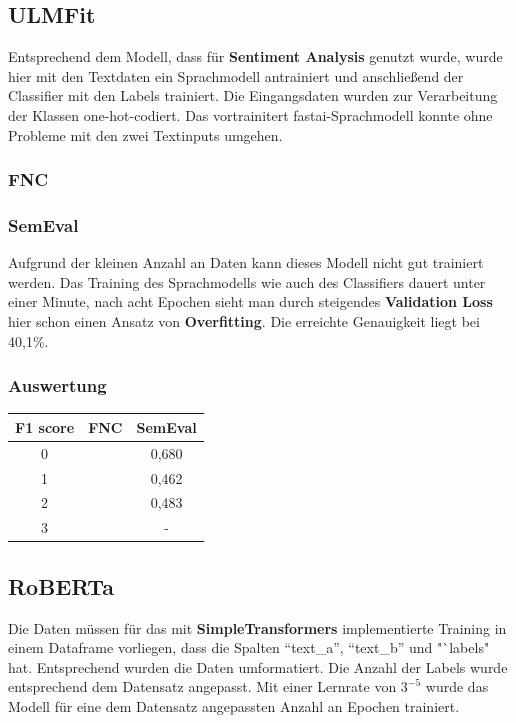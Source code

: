 \subsection{ULMFit}
Entsprechend dem Modell, dass f\"ur \textbf{Sentiment Analysis} genutzt wurde, wurde hier mit den Textdaten ein Sprachmodell antrainiert und anschlie{\ss}end der Classifier mit den Labels trainiert. Die Eingangsdaten wurden zur Verarbeitung der Klassen one-hot-codiert. Das vortrainitert fastai-Sprachmodell konnte ohne Probleme mit den zwei Textinputs umgehen.

\subsubsection*{FNC}

\subsubsection*{SemEval}
Aufgrund der kleinen Anzahl an Daten kann dieses Modell nicht gut trainiert werden. Das Training des Sprachmodells wie auch des Classifiers dauert unter einer Minute, nach acht Epochen sieht man durch steigendes \textbf{Validation Loss} hier schon einen Ansatz von \textbf{Overfitting}. Die erreichte Genauigkeit liegt bei 40,1\%.

\subsubsection*{Auswertung}
\begin{center}
\begin{tabular}{|c||c|c|}
\hline
F1 score & FNC & SemEval\\ 
\hline\hline
0 &  & 0,680\\
\hline
1 &  & 0,462\\ 
\hline
2 &  & 0,483\\
\hline
3 &  & -\\
\hline    
\end{tabular}
\end{center}

\subsection{RoBERTa}
Die Daten m\"ussen f\"ur das mit \textbf{SimpleTransformers} implementierte Training in einem Dataframe vorliegen, dass die Spalten "`text\_a"', "`text\_b"' und "`labels"  hat. Entsprechend wurden die Daten umformatiert. Die Anzahl der Labels wurde entsprechend dem Datensatz angepasst. Mit einer Lernrate von $3^{-5}$ wurde das Modell f\"ur eine dem Datensatz angepassten Anzahl an Epochen trainiert.

